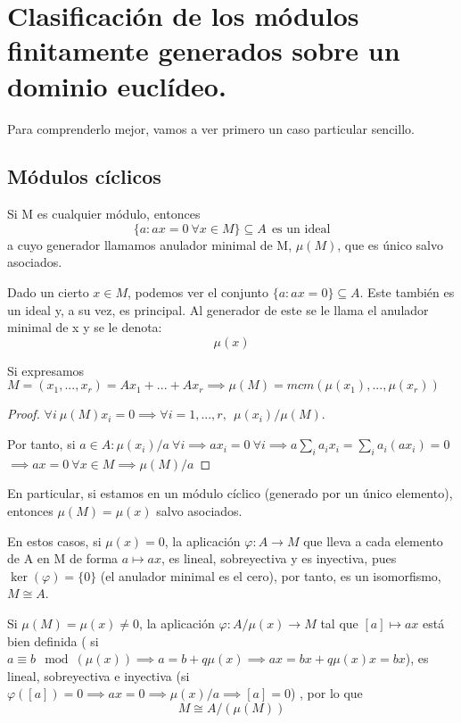 \section{Clasificación de los módulos finitamente generados sobre un dominio euclídeo.}

Para comprenderlo mejor, vamos a ver primero un caso particular sencillo.
\subsection{Módulos cíclicos}
\begin{ndef}
	Si M es cualquier módulo, entonces
	\[
	\{a: ax = 0 \ \forall x \in M\}\subseteq A \ \  \text{es un ideal}
	\]
	a cuyo generador llamamos anulador minimal de M, $\mu(M)$, que es único salvo asociados.
\end{ndef}

Dado un cierto $x\in M$, podemos ver el conjunto $\{a : ax = 0\} \subseteq A$. Este también es un ideal y, a su vez, es principal. Al generador de este se le llama el anulador minimal de x y se le denota:
\[
\mu(x)
\]

\begin{nprop}
	Si expresamos $M= (x_1,...,x_r) = Ax_1 + ...+ Ax_r \implies \mu(M) = mcm(\mu(x_1),...,\mu(x_r))$
\end{nprop}
\begin{proof}
	$\forall i \ \mu(M)x_i = 0 \implies \forall i=1,...,r, \ \ \mu(x_i) / \mu(M)$.

	Por tanto, si $a\in A: \mu(x_i)/a \ \forall i \implies ax_i = 0 \ \forall i \implies a\sum_i a_ix_i = \sum_i a_i(ax_i) = 0$
	$\implies ax = 0 \ \forall x \in M \implies \mu(M) / a$
\end{proof}

En particular, si estamos en un módulo cíclico (generado por un único elemento), entonces $\mu(M) = \mu(x)$ salvo asociados.

\begin{nota}
	En estos casos, si $\mu(x) = 0$, la aplicación $\varphi: A \to M$ que lleva a cada elemento de A en M de forma $a \mapsto ax$, es lineal, sobreyectiva y es inyectiva, pues $\ker(\varphi) = \{0\}$ (el anulador minimal es el cero), por tanto, es un isomorfismo, $M \cong A$.
\end{nota}

\begin{nota}
	Si $\mu(M) = \mu(x) \ne 0$, la aplicación $\varphi :A/\mu(x) \to M$ tal que $[a]\mapsto ax$ está bien definida ( si $a \equiv b \mod(\mu(x)) \implies a = b+q\mu(x) \implies ax = bx +q\mu(x)x = bx$), es lineal, sobreyectiva e inyectiva (si $\varphi([a]) = 0 \implies ax = 0 \implies  \mu(x)/a \implies [a] = 0$) , por lo que
	\[
	M  \cong A/(\mu(M))
	\]
\end{nota}

